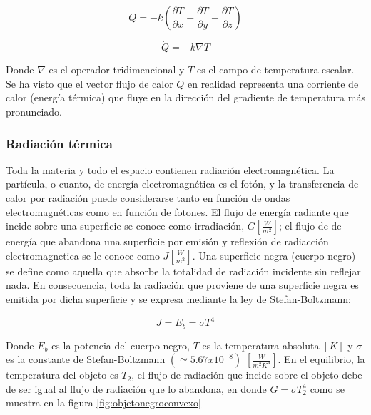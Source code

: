 \documentclass[12pt,letterpaper]{article}     %
\begin{document}
\begin{equation}
\dot{Q} = -k(\frac{\partial T}{\partial x} + \frac{\partial T}{\partial y} + \frac{\partial T}{\partial z})   
    \label{eq:Fouriervectorialmente}
\end{equation}

\begin{equation}
\dot{Q} = -k\nabla T   
    \label{eq:Fouriernabla}
\end{equation}

\cite[p\ 1-2]{Warren} Donde $\nabla$ es el operador tridimencional y $T$ es el campo de temperatura escalar. Se ha visto que el vector flujo de calor $\dot{Q}$ en realidad representa una corriente de calor (energía térmica) que fluye en la dirección del gradiente de temperatura más pronunciado.



\subsubsection{Radiación térmica}

\cite[p\ 13-14]{Mills} Toda la materia y todo el espacio contienen radiación electromagnética. La partícula, o cuanto, de energía electromagnética es el fotón, y la transferencia de calor por radiación puede considerarse tanto en función de ondas electromagnéticas como en función de fotones. El flujo de energía radiante que incide sobre una superficie se conoce como irradiación, $G [\frac{W}{m^2}]$;  el flujo de de energía que abandona una superficie por emisión y reflexión de radiacción electromagnetica se le conoce como $J [\frac{W}{m^2}]$. Una superficie negra (cuerpo negro) se define como aquella que absorbe la totalidad de radiación incidente sin reflejar nada. En consecuencia, toda la radiación que proviene de una superficie negra es emitida por dicha superficie y se expresa mediante la ley de Stefan-Boltzmann:

\begin{equation}
    J = E_{b} = \sigma T^4
     \label{eq:Boltzmann1}
\end{equation}
 
 Donde $E_{b}$ es la potencia del cuerpo negro, $T$ es la temperatura absoluta $[K]$ y $\sigma$ es la constante de Stefan-Boltzmann $(\simeq 5.67x10^{-8})$ $[\frac{W}{m^2 K^4}]$. En el equilibrio, la temperatura del objeto es $T_{2}$, el flujo de radiación que incide sobre el objeto debe de ser igual al flujo de radiación que lo abandona, en donde $ G = \sigma T_{2}^{4}$ como se muestra en la figura \ref{fig:objetonegroconvexo}
 
\end{document}
